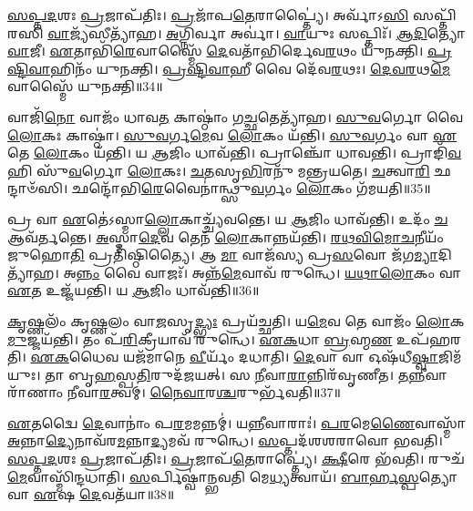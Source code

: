 \-\ul{𑌸}\-\-\ul{𑌪𑍍𑌤}\-\-\ul{𑌦}\-𑌶𑌃 \ul{𑌪𑍍𑌰}\-𑌜𑌾\-𑌪᳴𑌤𑌿𑌃।
\-\ul{𑌪𑍍𑌰}\-𑌜𑌾᳴𑌪\-\ul{𑌤𑍇}\-𑌰𑌾𑌪𑍍𑌤𑍍𑌯𑍈॑।
𑌅𑌰𑍍𑌵𑌾᳴𑌽\-\ul{𑌸𑌿} 𑌸𑌪𑍍𑌤𑌿᳴𑌰𑌸𑌿 \ul{𑌵𑌾}\-𑌜𑍍𑌯᳴𑌸𑍀𑌤𑍍𑌯𑌾᳴𑌹।
\-\ul{𑌅}\-𑌗𑍍𑌨𑌿𑌰𑍍𑌵𑌾 𑌅𑌰𑍍𑌵𑌾॑।
\-\ul{𑌵𑌾}\-𑌯𑍁𑌃 𑌸𑌪𑍍𑌤𑌿𑌃᳴।
\-\ul{𑌆}\-\-\ul{𑌦𑌿}\-𑌤𑍍𑌯𑍋 \ul{𑌵𑌾}\-𑌜𑍀।
\-\ul{𑌏}\-𑌤𑌾𑌭𑌿᳴\-\ul{𑌰𑍇}\-𑌵𑌾𑌸𑍍𑌮𑍈᳴ \ul{𑌦𑍇}\-𑌵𑌤𑌾᳴𑌭𑌿𑌰𑍍𑌦𑍇𑌵\-\ul{𑌰}\-𑌥𑌂 𑌯𑍁᳴𑌨𑌕𑍍𑌤𑌿।
\-\ul{𑌪𑍍𑌰}\-\-\ul{𑌷𑍍𑌟𑌿}\-\-\ul{𑌵𑌾}\-𑌹𑌿𑌨𑌂᳴ 𑌯𑍁𑌨𑌕𑍍𑌤𑌿।
\-\ul{𑌪𑍍𑌰}\-\-\ul{𑌷𑍍𑌟𑌿}\-\-\ul{𑌵𑌾}\-𑌹𑍀 𑌵𑍈 𑌦𑍇᳴𑌵\-\ul{𑌰}\-𑌥𑌃।
\-\ul{𑌦𑍇}\-\-\ul{𑌵}\-\-\ul{𑌰}\-𑌥\-\ul{𑌮𑍇}\-𑌵𑌾𑌸𑍍𑌮𑍈᳴ 𑌯𑍁𑌨𑌕𑍍𑌤𑌿॥34॥

𑌵𑌾𑌜𑌿᳴\-\ul{𑌨𑍋} 𑌵𑌾𑌜𑌂᳴ 𑌧𑌾𑌵\-\ul{𑌤} 𑌕𑌾𑌷𑍍𑌠𑌾𑌂॑ 𑌗\-\ul{𑌚𑍍𑌛}\-𑌤𑍇𑌤𑍍𑌯𑌾᳴𑌹।
\-\ul{𑌸𑍁}\-\-\ul{𑌵}\-𑌰𑍍𑌗𑍋 𑌵𑍈 \ul{𑌲𑍋}\-𑌕𑌃 𑌕𑌾𑌷𑍍𑌠𑌾॑।
\-\ul{𑌸𑍁}\-\-\ul{𑌵}\-𑌰𑍍𑌗\-\ul{𑌮𑍇}\-𑌵 \ul{𑌲𑍋}\-𑌕𑌂 𑌯᳴𑌨𑍍𑌤𑌿।
\-\ul{𑌸𑍁}\-\-\ul{𑌵}\-𑌰𑍍𑌗𑌂 𑌵𑌾 \ul{𑌏}\-𑌤𑍇 \ul{𑌲𑍋}\-𑌕𑌂 𑌯᳴𑌨𑍍𑌤𑌿।
𑌯 \ul{𑌆}\-𑌜𑌿𑌂 𑌧𑌾𑌵᳴𑌨𑍍𑌤𑌿।
𑌪𑍍𑌰𑌾𑌞𑍍𑌚𑍋᳴ 𑌧𑌾𑌵𑌨𑍍𑌤𑌿।
𑌪𑍍𑌰𑌾𑌙𑌿᳴\-\ul{𑌵} 𑌹𑌿 𑌸𑍁᳴\-\ul{𑌵}\-𑌰𑍍𑌗𑍋 \ul{𑌲𑍋}\-𑌕𑌃।
\-\ul{𑌚}\-\-\ul{𑌤}\-𑌸𑍃\-\ul{𑌭𑌿}\-𑌰𑌨𑍁᳴ 𑌮𑌨𑍍𑌤𑍍𑌰𑌯𑌤𑍇।
\-\ul{𑌚}\-𑌤𑍍𑌵𑌾\-\ul{𑌰𑌿} 𑌛𑌨𑍍𑌦𑌾𑍞᳴𑌸𑌿।
𑌛𑌨𑍍𑌦𑍋᳴𑌭𑌿\-\ul{𑌰𑍇}\-𑌵𑍈𑌨𑌾॑𑌨𑍍𑌥𑍍𑌸𑍁\-\ul{𑌵}\-𑌰𑍍𑌗𑌂 \ul{𑌲𑍋}\-𑌕𑌂 𑌗᳴𑌮𑌯𑌤𑌿॥35॥

𑌪𑍍𑌰 𑌵𑌾 \ul{𑌏}\-𑌤𑍇॑\-𑌽𑌸𑍍𑌮𑌾\-\ul{𑌲𑍍𑌲𑍋}\-𑌕𑌾𑌚𑍍𑌚𑍍𑌯᳴𑌵𑌨𑍍𑌤𑍇।
𑌯 \ul{𑌆}\-𑌜𑌿𑌂 𑌧𑌾𑌵᳴𑌨𑍍𑌤𑌿।
𑌉𑌦𑌂᳴ \ul{𑌚} 𑌆𑌵᳴𑌰𑍍𑌤𑌨𑍍𑌤𑍇।
\-\ul{𑌅}\-𑌸𑍍𑌮𑌾\-\ul{𑌦𑍇}\-𑌵 𑌤𑍇𑌨᳴ \ul{𑌲𑍋}\-𑌕𑌾𑌨𑍍𑌨𑌯᳴𑌨𑍍𑌤𑌿।
\-\ul{𑌰}\-\-\ul{𑌥}\-\-\ul{𑌵𑌿}\-\-\ul{𑌮𑍋}\-\-\ul{𑌚}\-𑌨𑍀𑌯𑌂᳴ 𑌜𑍁𑌹𑍋\-\ul{𑌤𑌿} 𑌪𑍍𑌰𑌤𑌿᳴\-𑌷𑍍𑌠𑌿𑌤𑍍𑌯𑍈।
𑌆 \ul{𑌮𑌾} 𑌵𑌾𑌜᳴𑌸𑍍𑌯 𑌪𑍍𑌰\-\ul{𑌸}\-𑌵𑍋 𑌜᳴𑌗\-\ul{𑌮𑍍𑌯𑌾}\-𑌦𑌿𑌤𑍍𑌯𑌾᳴𑌹।
𑌅\-\ul{𑌨𑍍𑌨𑌂} 𑌵𑍈 𑌵𑌾𑌜𑌃᳴।
𑌅𑌨𑍍𑌨᳴\-\ul{𑌮𑍇}\-𑌵𑌾𑌵᳴ 𑌰𑍁𑌨𑍍𑌧𑍇।
\-\ul{𑌯}\-\-\ul{𑌥𑌾}\-\-\ul{𑌲𑍋}\-𑌕𑌂 𑌵𑌾 \ul{𑌏}\-𑌤 𑌉𑌜𑍍𑌜᳴𑌯𑌨𑍍𑌤𑌿।
𑌯 \ul{𑌆}\-𑌜𑌿𑌂 𑌧𑌾𑌵᳴𑌨𑍍𑌤𑌿॥36॥

\-\ul{𑌕𑍃}\-𑌷𑍍𑌣𑌲𑌂᳴ 𑌕𑍃𑌷𑍍𑌣𑌲𑌂 𑌵𑌾\-\ul{𑌜}\-𑌸𑍃\-\ul{𑌦𑍍𑌭𑍍𑌯𑌃} 𑌪𑍍𑌰𑌯᳴𑌚𑍍𑌛𑌤𑌿।
𑌯\-\ul{𑌮𑍇}\-𑌵 𑌤𑍇 𑌵𑌾𑌜𑌂᳴ \ul{𑌲𑍋}\-𑌕\-\ul{𑌮𑍁}\-𑌜𑍍𑌜𑌯᳴𑌨𑍍𑌤𑌿।
𑌤𑌂 𑌪᳴\-\ul{𑌰𑌿}\-𑌕𑍍𑌰𑍀𑌯𑌾𑌵᳴ 𑌰𑍁𑌨𑍍𑌧𑍇।
\-\ul{𑌏}\-\-\ul{𑌕}\-𑌧𑌾 \ul{𑌬𑍍𑌰}\-𑌹𑍍𑌮\-\ul{𑌣} 𑌉𑌪᳴𑌹𑌰𑌤𑌿।
\-\ul{𑌏}\-\-\ul{𑌕}\-𑌧𑍈𑌵 𑌯𑌜᳴𑌮𑌾𑌨𑍇 \ul{𑌵𑍀}\-𑌰𑍍𑌯𑌂᳴ 𑌦𑌧𑌾𑌤𑌿।
\-\ul{𑌦𑍇}\-𑌵𑌾 𑌵𑌾 𑌓𑌷᳴𑌧𑍀\-\ul{𑌷𑍍𑌵𑌾}\-𑌜𑌿𑌮᳴𑌯𑍁𑌃।
𑌤𑌾 𑌬𑍃\-\ul{𑌹}\-𑌸𑍍𑌪\-\ul{𑌤𑌿}\-𑌰𑍁𑌦᳴𑌜𑌯𑌤𑍍।
𑌸 \ul{𑌨𑍀}\-𑌵𑌾\-\ul{𑌰𑌾}\-𑌨𑍍𑌨𑌿𑌰᳴𑌵𑍃𑌣𑍀𑌤।
𑌤\-\ul{𑌨𑍍𑌨𑍀}\-𑌵𑌾𑌰𑌾᳴𑌣𑌾𑌂 𑌨𑍀𑌵𑌾\-\ul{𑌰}\-𑌤𑍍𑌵𑌮𑍍।
\-\ul{𑌨𑍈}\-\-\ul{𑌵𑌾}\-𑌰\-\ul{𑌶𑍍𑌚}\-𑌰𑍁𑌰𑍍𑌭᳴𑌵𑌤𑌿॥37॥

\-\ul{𑌏}\-𑌤𑌦𑍍𑌵𑍈 \ul{𑌦𑍇}\-𑌵𑌾𑌨𑌾𑌂॑ 𑌪\-\ul{𑌰}\-𑌮𑌮𑌨𑍍𑌨𑌮𑍍॑।
𑌯\-\ul{𑌨𑍍𑌨𑍀}\-𑌵𑌾𑌰𑌾𑌃॑।
\-\ul{𑌪}\-\-\ul{𑌰}\-𑌮𑍇\-\ul{𑌣𑍈}\-𑌵𑌾𑌸𑍍𑌮𑌾᳴ \ul{𑌅}\-𑌨𑍍𑌨𑌾\-\ul{𑌦𑍍𑌯𑍇}\-𑌨𑌾𑌵᳴𑌰\-\ul{𑌮}\-𑌨𑍍𑌨𑌾\-\ul{𑌦𑍍𑌯}\-𑌮𑌵᳴ 𑌰𑍁𑌨𑍍𑌧𑍇।
\-\ul{𑌸}\-𑌪𑍍𑌤𑌦᳴𑌶𑌶𑌰𑌾𑌵𑍋 𑌭𑌵𑌤𑌿।
\-\ul{𑌸}\-\-\ul{𑌪𑍍𑌤}\-\-\ul{𑌦}\-𑌶𑌃 \ul{𑌪𑍍𑌰}\-𑌜𑌾\-𑌪᳴𑌤𑌿𑌃।
\-\ul{𑌪𑍍𑌰}\-𑌜𑌾𑌪᳴\-\ul{𑌤𑍇}\-𑌰𑌾𑌪𑍍𑌤𑍍𑌯𑍇॑।
\-\ul{𑌕𑍍𑌷𑍀}\-𑌰𑍇 𑌭᳴𑌵𑌤𑌿।
𑌰𑍁𑌚᳴\-\ul{𑌮𑍇}\-𑌵𑌾𑌸𑍍𑌮𑌿᳴𑌨𑍍𑌦𑌧𑌾𑌤𑌿।
\-\ul{𑌸}\-𑌰𑍍𑌪𑌿𑌷𑍍𑌵𑌾॑𑌨𑍍𑌭𑌵𑌤𑌿 𑌮𑍇\-\ul{𑌧𑍍𑌯}\-𑌤𑍍𑌵𑌾𑌯᳴।
\-\ul{𑌬𑌾}\-\-\ul{𑌰𑍍}\-\-\ul{𑌹}\-\-\ul{𑌸𑍍𑌪}\-𑌤𑍍𑌯𑍋 𑌵𑌾 \ul{𑌏}\-𑌷 \ul{𑌦𑍇}\-𑌵𑌤᳴𑌯𑌾॥38॥

